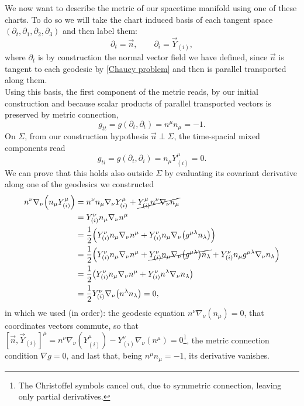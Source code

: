 We now want to describe the metric of our spacetime manifold using one of these charts. To do so we will take the chart induced basis of each tangent space $(\partial_t,\partial_1,\partial_2,\partial_3)$ and then label them:
\begin{equation*}
    \partial_t=\vec n,\qquad \partial_i= \vec Y_{(i)},
\end{equation*}
where $\partial_t$ is by construction the normal vector field we have defined, since $\vec n$ is tangent to each geodesic by \eqref{Chaucy problem} and then is parallel transported along them.\\
Using this basis, the first component of the metric reads, by our initial construction and because scalar products of parallel transported vectors is preserved by metric connection,
\begin{equation*}
    g_{tt}=g(\partial_t,\partial_t)=n^\mu n_\mu=-1.\label{gen gtt}
\end{equation*} 
On $\Sigma$, from our construction hypothesis $\vec{n}\perp\Sigma $, the time-spacial mixed components read 
\begin{equation*}
    g_{ti}=g(\partial_t,\partial_i)=n_\mu Y^\mu_{(i)}=0.\label{gen gti}
\end{equation*} 
We can prove that this holds also outside $\Sigma$ by evaluating its covariant derivative along one of the geodesics we constructed
\begin{align*}
    n^\nu\nabla_\nu\Big(n_\mu Y_{(i)}^\mu\Big)&=n^\nu n_\mu \nabla_\nu Y_{(i)}^\mu+\cancel{Y_{(i)}^\mu n^\nu  \nabla_\nu n_\mu}\\
    &=Y^\nu_{(i)}n_\mu\nabla_\nu n^\mu\\
    &=\frac{1}{2}\Big(Y^\nu_{(i)}n_\mu\nabla_\nu n^\mu+Y^\nu_{(i)}n_\mu\nabla_\nu\big(g^{\mu\lambda}n_{\lambda}\big)\Big)\\
    &=\frac{1}{2}\Big(Y^\nu_{(i)}n_\mu\nabla_\nu n^\mu+\cancel{Y^\nu_{(i)}n_\mu\nabla_\nu\big(g^{\mu\lambda}\big)n_{\lambda}}+Y^\nu_{(i)}n_\mu g^{\mu\lambda}\nabla_\nu n_{\lambda}\Big)\\
    &=\frac{1}{2}\big(Y^\nu_{(i)}n_\mu\nabla_\nu n^\mu+Y^\nu_{(i)}n^\lambda\nabla_\nu n_{\lambda}\big)\\
    &=\frac{1}{2}Y^\nu_{(i)}\nabla_\nu\big(n^\lambda n_\lambda\big)=0,
\end{align*}
in which we used (in order): the geodesic equation $n^\nu  \nabla_\nu(n_\mu )=0$, that coordinates vectors commute, so that $[\vec n,\vec Y_{(i)}]^\mu=n^\nu \nabla_\nu( Y_{(i)}^\mu)-Y^\nu_{(i)}\nabla_\nu(n^\mu)=0$\footnote{The Christoffel symbols cancel out, due to symmetric connection, leaving only partial derivatives.}, the metric connection condition $\nabla g=0$, and last that, being $n^\mu n_\mu=-1$, its derivative vanishes.\\
